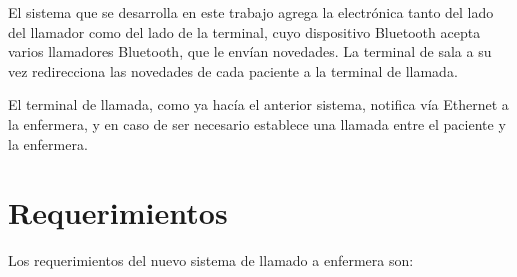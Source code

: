 El sistema que se desarrolla en este trabajo agrega la electrónica tanto del lado del llamador como del lado de la terminal, cuyo dispositivo Bluetooth acepta varios llamadores Bluetooth, que le envían novedades. La terminal de sala  a su vez redirecciona las novedades de cada paciente a la terminal de llamada.

El terminal de llamada, como ya hacía el anterior sistema, notifica vía Ethernet a la enfermera, y en caso de ser necesario establece una llamada entre el paciente y la enfermera.


\section{Requerimientos}

Los requerimientos del nuevo sistema de llamado a enfermera son:


